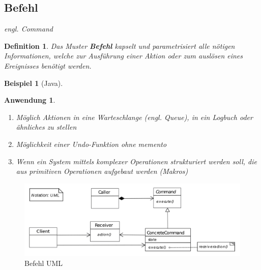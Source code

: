 \documentclass[a4paper]{article}
\theoremstyle{break}
\newtheorem{defi}{Definition}[section]
\newtheorem{ex}{Beispiel}[section]
\newtheorem{why}{Anwendung}[section]
\begin{document}
\subsection{Befehl}
\textit{engl. Command}
\begin{defi}
	Das Muster \textbf{Befehl} kapselt und parametrisiert alle nötigen Informationen, welche zur Ausführung einer Aktion oder zum auslösen eines Ereignisses benötigt werden.
\end{defi}
\begin{ex}[Java]
	

	
	
\end{ex}
\begin{why}
	\begin{enumerate}
		\item Möglich Aktionen in eine Warteschlange (\textit{engl. Queue}), in ein Logbuch oder ähnliches zu stellen
		\item Möglichkeit einer Undo-Funktion ohne memento
		\item Wenn ein System mittels komplexer Operationen	strukturiert werden soll, die aus primitiven Operationen aufgebaut werden (Makros)
	\end{enumerate}
\end{why}
\begin{figure}[H]
	\centering
	\includegraphics[width=\textwidth]{../diagrams/uml/CommandPattern.png}
	\caption{Befehl UML}
\end{figure}


\newpage
\end{document}
